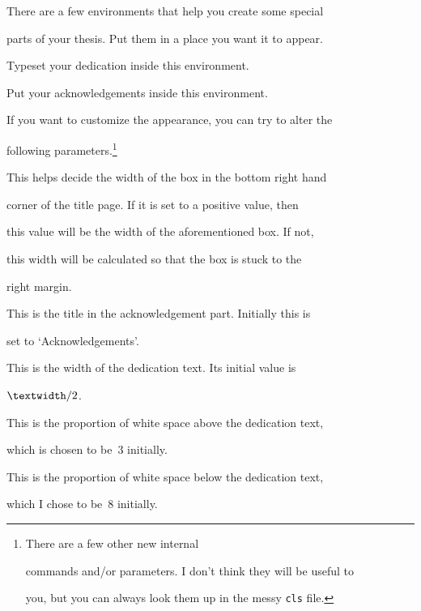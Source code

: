 \documentclass{bhamthesis}
\newcommand{\bksl}{\char`\\}
\newcommand{\cmd}[1]{\texttt{\bksl{}#1}}
\newcommand{\env}[1]{\texttt{#1}}
\newcommand{\ext}[1]{\texttt{#1}}
\newcommand{\cmddessep}{\renewcommand{\labelsep}{2em}}
\begin{document}
There are a few environments that help you create some special

parts of your thesis.  Put them in a place you want it to appear.

\begin{description}\cmddessep

\item[\env{dedication}]

 Typeset your dedication inside this environment.

\item[\env{acknowledgements}]

 Put your acknowledgements inside this environment.

\end{description}



If you want to customize the appearance, you can try to alter the

following parameters.\footnote{There are a few other new internal

commands and/or parameters.  I don't think they will be useful to

you, but you can always look them up in the messy \ext{cls} file.}

\begin{description}\cmddessep

\item[\cmd{addsswidth}]

 This helps decide the width of the box in the bottom right hand

 corner of the title page. If it is set to a positive value, then

 this value will be the width of the aforementioned box. If not,

 this width will be calculated so that the box is stuck to the

 right margin.

\item[\cmd{acknowname}]

 This is the title in the acknowledgement part. Initially this is

 set to `Acknowledgements'.

\item[\cmd{dedwidth}]

 This is the width of the dedication text. Its initial value is

 $\text{\cmd{textwidth}}/2$.

\item[\cmd{dedabove}]

 This is the proportion of white space above the dedication text,

 which is chosen to be~$3$ initially.

\item[\cmd{dedbelow}]

 This is the proportion of white space below the dedication text,

 which I chose to be~$8$ initially.

\end{description}
\end{document}
